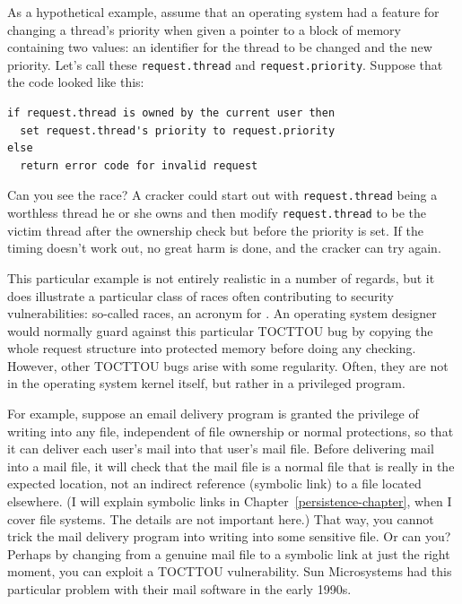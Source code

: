 As a hypothetical example, assume that an operating system had a
feature for changing a thread's priority when given a pointer to a
block of memory containing two values: an identifier for the thread to
be changed and the new priority.  Let's call these
\verb|request.thread| and \verb|request.priority|.  Suppose that the
code looked like this:
\begin{verbatim}
if request.thread is owned by the current user then
  set request.thread's priority to request.priority
else      
  return error code for invalid request
\end{verbatim}
Can you see the race?   A cracker could start out with
\verb|request.thread| being a worthless thread he or she owns and then modify
\verb|request.thread| to be the victim thread after the ownership check but
before the priority is set.  If the timing doesn't work out, no great
harm is done, and the cracker can try again.

This particular example is not entirely realistic in a number of
regards, but it does illustrate a particular class of races often
contributing to security vulnerabilities: so-called  races,
an acronym for .  An operating system
designer would normally guard against this particular TOCTTOU bug by
copying the whole request structure into protected memory before doing
any checking.  However, other TOCTTOU bugs arise with some
regularity.  Often, they are not in the operating system kernel
itself, but rather in a privileged program.

For example, suppose an email delivery program is granted the
privilege of writing into any file, independent of file ownership or
normal protections, so that it can deliver each user's mail into that
user's mail file.  Before delivering mail into a mail file, it will
check that the mail file is a normal file that is really in the expected
location, not an indirect reference (symbolic link) to a file located
elsewhere.  (I will explain symbolic links in Chapter~\ref{persistence-chapter}, when I cover file
systems.  The details are not important here.)  That way, you cannot
trick the mail delivery program into writing into some sensitive file.
Or can you?  Perhaps by changing from a genuine mail file to a
symbolic link at just the right moment, you can exploit a TOCTTOU
vulnerability.  Sun Microsystems had this particular problem with
their mail software in the early 1990s.

